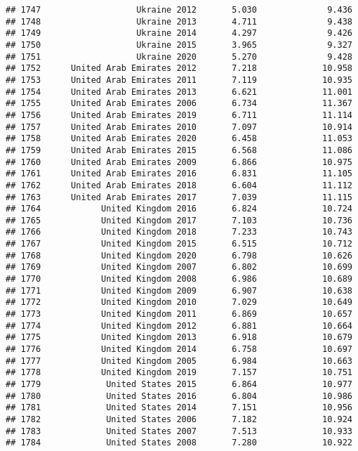 \documentclass[
]{article}
\begin{document}
\begin{verbatim}
## 1747                   Ukraine 2012       5.030              9.436
## 1748                   Ukraine 2013       4.711              9.438
## 1749                   Ukraine 2014       4.297              9.426
## 1750                   Ukraine 2015       3.965              9.327
## 1751                   Ukraine 2020       5.270              9.428
## 1752      United Arab Emirates 2012       7.218             10.958
## 1753      United Arab Emirates 2011       7.119             10.935
## 1754      United Arab Emirates 2013       6.621             11.001
## 1755      United Arab Emirates 2006       6.734             11.367
## 1756      United Arab Emirates 2019       6.711             11.114
## 1757      United Arab Emirates 2010       7.097             10.914
## 1758      United Arab Emirates 2020       6.458             11.053
## 1759      United Arab Emirates 2015       6.568             11.086
## 1760      United Arab Emirates 2009       6.866             10.975
## 1761      United Arab Emirates 2016       6.831             11.105
## 1762      United Arab Emirates 2018       6.604             11.112
## 1763      United Arab Emirates 2017       7.039             11.115
## 1764            United Kingdom 2016       6.824             10.724
## 1765            United Kingdom 2017       7.103             10.736
## 1766            United Kingdom 2018       7.233             10.743
## 1767            United Kingdom 2015       6.515             10.712
## 1768            United Kingdom 2020       6.798             10.626
## 1769            United Kingdom 2007       6.802             10.699
## 1770            United Kingdom 2008       6.986             10.689
## 1771            United Kingdom 2009       6.907             10.638
## 1772            United Kingdom 2010       7.029             10.649
## 1773            United Kingdom 2011       6.869             10.657
## 1774            United Kingdom 2012       6.881             10.664
## 1775            United Kingdom 2013       6.918             10.679
## 1776            United Kingdom 2014       6.758             10.697
## 1777            United Kingdom 2005       6.984             10.663
## 1778            United Kingdom 2019       7.157             10.751
## 1779             United States 2015       6.864             10.977
## 1780             United States 2016       6.804             10.986
## 1781             United States 2014       7.151             10.956
## 1782             United States 2006       7.182             10.924
## 1783             United States 2007       7.513             10.933
## 1784             United States 2008       7.280             10.922

\end{verbatim}
\end{document}
